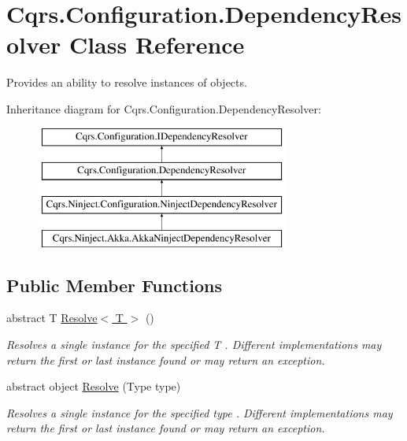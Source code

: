 \hypertarget{classCqrs_1_1Configuration_1_1DependencyResolver}{}\section{Cqrs.\+Configuration.\+Dependency\+Resolver Class Reference}
\label{classCqrs_1_1Configuration_1_1DependencyResolver}


Provides an ability to resolve instances of objects.  


Inheritance diagram for Cqrs.\+Configuration.\+Dependency\+Resolver\+:\begin{figure}[H]
\begin{center}
\leavevmode
\includegraphics[height=4.000000cm]{classCqrs_1_1Configuration_1_1DependencyResolver}
\end{center}
\end{figure}
\subsection*{Public Member Functions}
\begin{DoxyCompactItemize}
\item 
abstract T \hyperlink{classCqrs_1_1Configuration_1_1DependencyResolver_a1eb177fc6c914b45d138642fb6d9454d_a1eb177fc6c914b45d138642fb6d9454d}{Resolve$<$ T $>$} ()
\begin{DoxyCompactList}\small\item\em Resolves a single instance for the specified {\itshape T} . Different implementations may return the first or last instance found or may return an exception. \end{DoxyCompactList}\item 
abstract object \hyperlink{classCqrs_1_1Configuration_1_1DependencyResolver_aaeeb3ad2e0ef44bd98469d843210205c_aaeeb3ad2e0ef44bd98469d843210205c}{Resolve} (Type type)
\begin{DoxyCompactList}\small\item\em Resolves a single instance for the specified {\itshape type} . Different implementations may return the first or last instance found or may return an exception. \end{DoxyCompactList}\end{DoxyCompactItemize}
